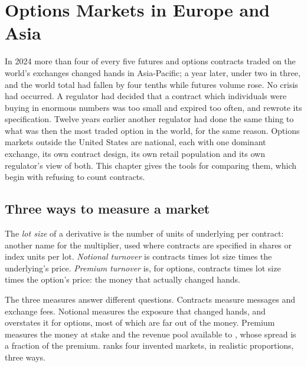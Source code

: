 \chapter{Options Markets in Europe and Asia}\label{ch:m1:options-markets-europe-asia}

In 2024 more than four of every five futures and options contracts traded on
the world's exchanges changed hands in Asia-Pacific; a year later, under
two in three, and the world total had fallen by four tenths while futures
volume rose. No crisis had occurred. A regulator had decided that a contract
which individuals were buying in enormous numbers was too small and expired
too often, and rewrote its specification. Twelve years earlier another
regulator had done the same thing to what was then the most traded option in
the world, for the same reason. Options markets outside the
United States are national, each with one dominant exchange, its own
contract design, its own retail population and its own regulator's view of
both. This chapter gives the tools for comparing them, which begin with
refusing to count contracts.

\section{Three ways to measure a market}

\begin{definition}\label{def:m1:options-markets-europe-asia:turnover}
The \emph{lot size} of a derivative is the
number of units of underlying per contract: another name for the multiplier,
used where contracts are specified in shares or index units per lot.
\emph{Notional turnover} is contracts times lot size
times the underlying's price. \emph{Premium turnover}
is, for options, contracts times lot size times the option's price: the money
that actually changed hands.
\end{definition}

The three measures answer different questions. Contracts measure messages
and exchange fees. Notional measures the exposure that changed hands, and
overstates it for options, most of which are far out of the money. Premium
measures the money at stake and the revenue pool available to ,
whose spread is a fraction of the premium.
 ranks four invented markets,
in realistic proportions, three ways.

